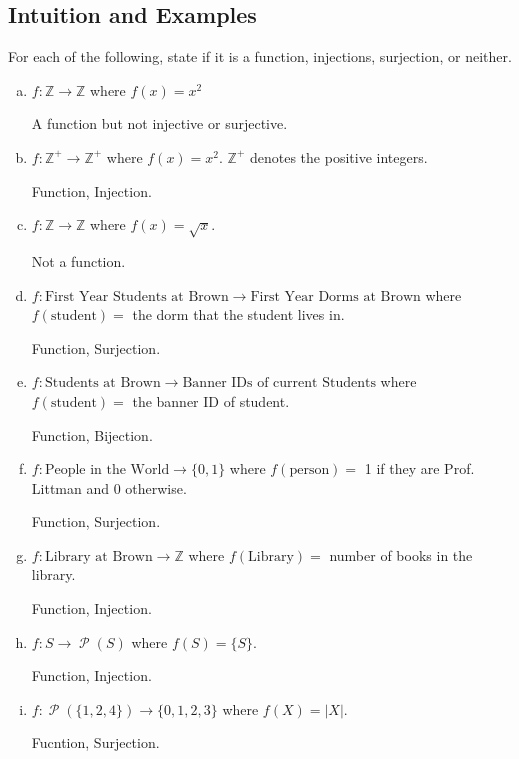 \documentclass[12pt,letterpaper]{article}
\newcommand\Z{\mathbb Z}
\newcommand\Pow{\ensuremath{\operatorname{\mathcal{P}}}}
\begin{document}
\subsection{Intuition and Examples}
\begin{mdframed}
For each of the following, state if it is a function, injections, surjection, or neither.
\begin{enumerate}[(a)]
    \item $f : \Z \rightarrow \Z$ where $f(x) = x^2$
    
    A function but not injective or surjective.
    
    \item $f : \Z^+ \rightarrow \Z^+$ where $f(x) = x^2$. $\Z^+$ denotes the positive integers.
    
    Function, Injection.
    \item $f: \Z \rightarrow \Z$ where $f(x) = \sqrt{x}$.
    
    Not a function.
    \item $f : \text{First Year Students at Brown} \rightarrow \text{First Year Dorms at Brown}$ where $f(\text{student}) = $ the dorm that the student lives in.
    
    Function, Surjection.
    \item $f : \text{Students at Brown} \rightarrow \text{Banner IDs of current Students}$ where $f(\text{student}) = $ the banner ID of student.
    
    Function, Bijection.
    
    \item $f : \text{People in the World} \rightarrow  \{0,1\}$ where $f(\text{person}) = $ 1 if they are Prof. Littman and 0 otherwise.
    
    Function, Surjection.
    
    \item $f : \text{Library at Brown} \rightarrow \Z$ where $f(\text{Library}) = $ number of books in the library.
    
    Function, Injection.
    
    \item $f: S \rightarrow \Pow{(S)}$ where $f(S) = \{S\}$.
    
    Function, Injection.
    
    \item $f: \Pow{(\{1,2,4\})} \rightarrow \{0,1,2,3\}$ where $f(X) = |X|$.
    
    Fucntion, Surjection.
\end{enumerate}
\end{mdframed}
    
\end{document}
